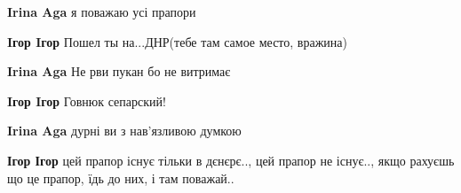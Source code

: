 \begin{itemize}
\begin{itemize}
\begin{itemize}
\textbf{Irina Aga} я поважаю усі прапори
\end{itemize}

 
\textbf{Iгор Iгор} Пошел ты на...ДНР(тебе там самое место, вражина)🤑🤑💩

\begin{itemize}
 
\textbf{Irina Aga} Не рви пукан бо не витримає
\end{itemize}

 
\textbf{Iгор Iгор} Говнюк сепарский!

\begin{itemize}
 
\textbf{Irina Aga} дурні ви з нав'язливою думкою
\end{itemize}

 
\textbf{Ігор Ігор} цей прапор існує тільки в дєнєрє.., цей прапор не існує.., якщо рахуєшь що це прапор, їдь до них, і там поважай..

\begin{itemize}
 

\end{itemize}
\end{itemize}
\end{itemize}
